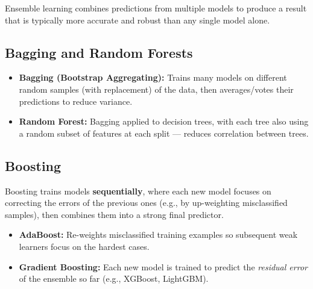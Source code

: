 \documentclass[11pt,a4paper]{article}
\begin{document}
\begin{definitionbox}
Ensemble learning combines predictions from multiple models to produce a result that is typically more accurate and robust than any single model alone.
\end{definitionbox}

\subsection{Bagging and Random Forests}
\begin{center}
\end{center}

\begin{itemize}[leftmargin=*]
  \item \textbf{Bagging (Bootstrap Aggregating):} Trains many models on different random samples (with replacement) of the data, then averages/votes their predictions to reduce variance.
  \item \textbf{Random Forest:} Bagging applied to decision trees, with each tree also using a random subset of features at each split --- reduces correlation between trees.
\end{itemize}

\subsection{Boosting}
\begin{conceptbox}
Boosting trains models \textbf{sequentially}, where each new model focuses on correcting the errors of the previous ones (e.g., by up-weighting misclassified samples), then combines them into a strong final predictor.
\end{conceptbox}
\begin{itemize}[leftmargin=*]
  \item \textbf{AdaBoost:} Re-weights misclassified training examples so subsequent weak learners focus on the hardest cases.
  \item \textbf{Gradient Boosting:} Each new model is trained to predict the \textit{residual error} of the ensemble so far (e.g., XGBoost, LightGBM).
\end{itemize}
\end{document}
